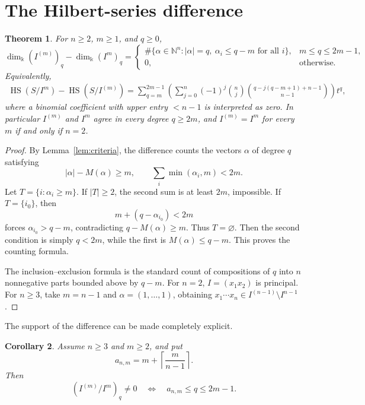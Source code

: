 \documentclass[11pt]{article}
\newtheorem{theorem}{Theorem}[section]
\newtheorem{corollary}[theorem]{Corollary}
\newcommand{\NN}{\mathbb N}
\newcommand{\HS}{\operatorname{HS}}
\begin{document}
\section{The Hilbert-series difference}

\begin{theorem}\label{thm:hilbert}
For \(n\ge2\), \(m\ge1\), and \(q\ge0\),
\[
 \dim_\Bbbk (I^{(m)})_q-\dim_\Bbbk(I^m)_q
 =
 \begin{cases}
 \#\{\alpha\in\NN^n:
 |\alpha|=q,\ \alpha_i\le q-m\text{ for all }i\},
 &m\le q\le2m-1,\\[2mm]
 0,&\text{otherwise}.
 \end{cases}
\]
Equivalently,
\begin{align*}
 \HS(S/I^m)-\HS(S/I^{(m)})
  =\sum_{q=m}^{2m-1}
   \left(
    \sum_{j=0}^n(-1)^j\binom nj
    \binom{q-j(q-m+1)+n-1}{n-1}
   \right)t^q,
\end{align*}
where a binomial coefficient with upper entry \(<n-1\) is interpreted
as zero.
In particular \(I^{(m)}\) and \(I^m\) agree in every degree
\(q\ge2m\), and \(I^{(m)}=I^m\) for every \(m\) if and only if \(n=2\).
\end{theorem}

\begin{proof}
By Lemma~\ref{lem:criteria}, the difference counts the vectors
\(\alpha\) of degree \(q\) satisfying
\[
 |\alpha|-M(\alpha)\ge m,
 \qquad
 \sum_i\min(\alpha_i,m)<2m.
\]
Let \(T=\{i:\alpha_i\ge m\}\).  If \(|T|\ge2\), the second sum is at
least \(2m\), impossible.  If \(T=\{i_0\}\), then
\[
 m+(q-\alpha_{i_0})<2m
\]
forces \(\alpha_{i_0}>q-m\), contradicting
\(q-M(\alpha)\ge m\).  Thus \(T=\varnothing\).  Then the second
condition is simply \(q<2m\), while the first is
\(M(\alpha)\le q-m\).  This proves the counting formula.

The inclusion--exclusion formula is the standard count of
compositions of \(q\) into \(n\) nonnegative parts bounded above by
\(q-m\).
For \(n=2\), \(I=(x_1x_2)\) is principal.  For \(n\ge3\), take
\(m=n-1\) and \(\alpha=(1,\ldots,1)\), obtaining
\(x_1\cdots x_n\in I^{(n-1)}\setminus I^{n-1}\).
\end{proof}

The support of the difference can be made completely explicit.

\begin{corollary}\label{cor:support}
Assume \(n\ge3\) and \(m\ge2\), and put
\[
 a_{n,m}=m+\left\lceil\frac{m}{n-1}\right\rceil.
\]
Then
\[
 (I^{(m)}/I^m)_q\ne0
 \quad\Longleftrightarrow\quad
 a_{n,m}\le q\le2m-1.
\]

\end{corollary}
\end{document}
